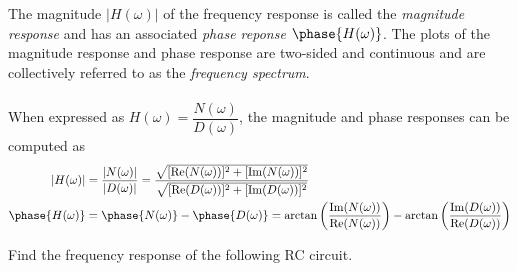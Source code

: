 \documentclass{report}
\begin{document}
The magnitude $|H(\omega)|$ of the frequency response is called the \emph{magnitude response} and has an associated \emph{phase reponse} $\phase{H(\omega)}$. 
The plots of the magnitude response and phase response are two-sided and continuous and are collectively referred to as the \emph{frequency spectrum}. 
\\ \\ 
When expressed as $H(\omega)=\dfrac{N(\omega)}{D(\omega)}$, the magnitude and phase responses can be computed as 
\begin{align}
    |H(\omega)| &= \frac{|N(\omega)|}{|D(\omega)|} = \frac{\sqrt{[\Re(N(\omega))]^2 + [\Im(N(\omega))]^2}}{\sqrt{[\Re(D(\omega))]^2 + [\Im(D(\omega))]^2}} \\
    \phase{H(\omega)} &=  \phase{N(\omega)} -  \phase{D(\omega)} = \arctan\left(\frac{\Im(N(\omega))}{\Re(N(\omega))}\right) - \arctan\left(\frac{\Im(D(\omega))}{\Re(D(\omega))}\right)
\end{align}
\begin{example}
    Find the frequency response of the following RC circuit. \\ \\
\end{example}
\end{document}
